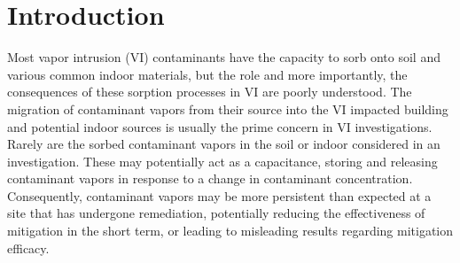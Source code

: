 \begin{comment}

What is the message of the paper?

Sorbed contaminants can significantly delay changes in concentration in the indoor air and the soil-gas depending on the particular soil and/or indoor materials found.
This has consequences if one is for instance interested in mitigating or remediating a VI site as sorption may significantly impede this effort.
It also has consequences for rooting out indoor contaminant sources as:
1. Even after ventilation and/or removing potential indoor sources, there may still be contaminant vapors being released from various materials.
2. It may decrease the effectiveness of applying the CPM.

What is the new result/contribution that you want to describe?

This study presents some new sorption information for TCE and runs never-done-before simulations that investigate the potential role of sorption in VI and VI investigations.

What do you want to convince people of?

1. Take indoor materials into account and perhaps removing or covering up exposed materials that have a high sorption capacity.
2. Take it into consideration that contaminants vapors may emanate from soils for a long time, since they potentially have such a large sorption capacity - almost acting a source in of themselves. E.g. that remediation or mitigation effort may be impeded by this.
3. Perhaps desorbing soil/indoor material samples to determine how significant sorption might be warranted.

\end{comment}

\section{Introduction}\label{sec:intro}

Most vapor intrusion (VI) contaminants have the capacity to sorb onto soil and various common indoor materials, but the role and more importantly, the consequences of these sorption processes in VI are poorly understood\cite{meininghaus_diffusion_2000,meininghaus_diffusion_2002,tillman_review_2005}.
The migration of contaminant vapors from their source into the VI impacted building and potential indoor sources is usually the prime concern in VI investigations.
Rarely are the sorbed contaminant vapors in the soil or indoor considered in an investigation.
These may potentially act as a capacitance, storing and releasing contaminant vapors in response to a change in contaminant concentration.
Consequently, contaminant vapors may be more persistent than expected at a site that has undergone remediation, potentially reducing the effectiveness of mitigation in the short term, or leading to misleading results regarding mitigation efficacy.\par

